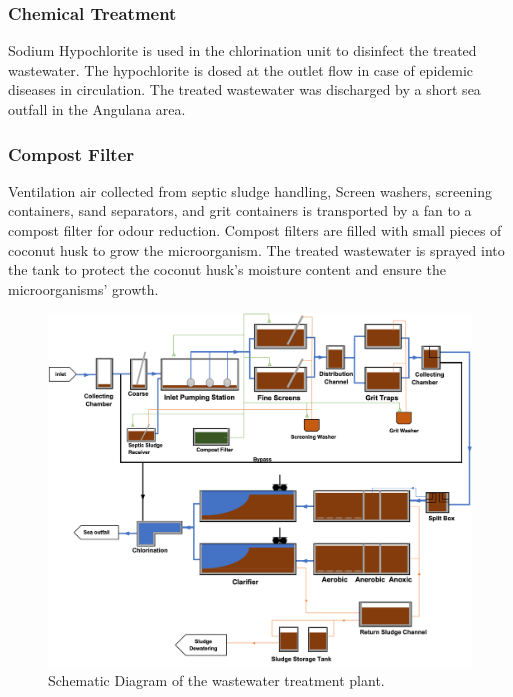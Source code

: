 \subsubsection{Chemical Treatment}
Sodium Hypochlorite is used in the chlorination unit to disinfect the treated wastewater. The hypochlorite is dosed at the outlet flow in case of epidemic diseases in circulation. The treated wastewater was discharged by a short sea outfall in the Angulana area.  

\subsubsection{Compost Filter}
Ventilation air collected from septic sludge handling, Screen washers, screening containers, sand separators, and grit containers is transported by a fan to a compost filter for odour reduction. Compost filters are filled with small pieces of coconut husk to grow the microorganism. The treated wastewater is sprayed into the tank to protect the coconut husk's moisture content and ensure the microorganisms' growth. 

\begin{figure}[H]
\centering
\includegraphics[width=1\linewidth]{material_and_methodology/diagram_of_treatment_plant.png}
\caption{Schematic Diagram of the wastewater treatment plant.}
\label{fig:treatment_plant}
\end{figure}

